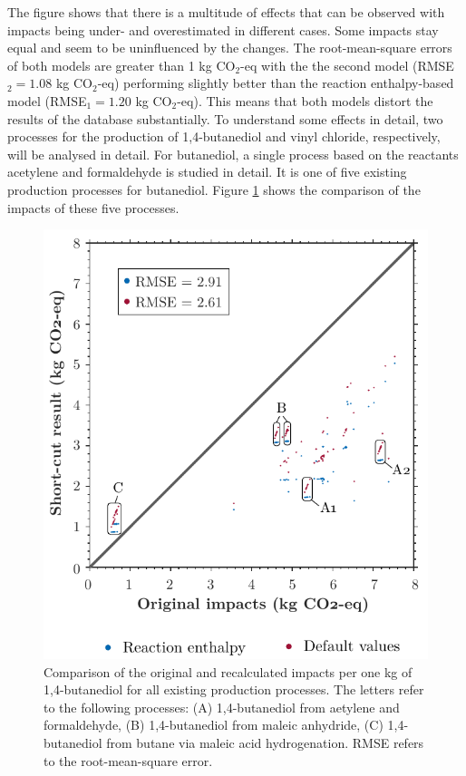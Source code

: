 The figure shows that there is a multitude of effects that can be observed with impacts being under- and overestimated in different cases. Some impacts stay equal and seem to be uninfluenced by the changes. The root-mean-square errors of both models are greater than 1 kg CO$_2$-eq with the the second model (RMSE$_2 = 1.08$ kg CO$_2$-eq) performing slightly better than the reaction enthalpy-based model (RMSE$_1 = 1.20$ kg CO$_2$-eq). This means that both models distort the results of the database substantially. To understand some effects in detail, two processes for the production of 1,4-butanediol and vinyl chloride, respectively, will be analysed in detail. For butanediol, a single process based on the reactants acetylene and formaldehyde is studied in detail. It is one of five existing production processes for butanediol.
Figure \ref{fig:butanediol} shows the comparison of the impacts of these five processes. 


\begin{figure}[htp!]
        \centering
        \includegraphics{images/butanediol.pdf}
        \caption{Comparison of the original and recalculated impacts per one kg of 1,4-butanediol for all existing production processes. The letters refer to the following processes: (A) 1,4-butanediol from aetylene and formaldehyde, (B) 1,4-butanediol from maleic anhydride, (C) 1,4-butanediol from butane via maleic acid hydrogenation. RMSE refers to the root-mean-square error.}
        \label{fig:butanediol}
\end{figure}

